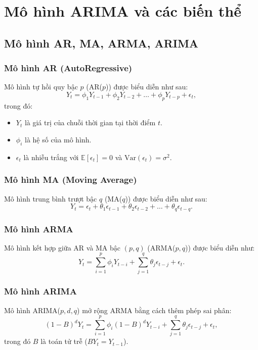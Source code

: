 \chapter{Mô hình ARIMA và các biến thể}

\section{Mô hình AR, MA, ARMA, ARIMA}

\subsection{Mô hình AR (AutoRegressive)}
Mô hình tự hồi quy bậc $p$ (AR($p$)) được biểu diễn như sau:
\begin{equation}
    Y_t = \phi_1 Y_{t-1} + \phi_2 Y_{t-2} + \dots + \phi_p Y_{t-p} + \epsilon_t,
\end{equation}
trong đó:
\begin{itemize}
    \item $Y_t$ là giá trị của chuỗi thời gian tại thời điểm $t$.
    \item $\phi_i$ là hệ số của mô hình.
    \item $\epsilon_t$ là nhiễu trắng với $\mathbb{E}[\epsilon_t] = 0$ và $\text{Var}(\epsilon_t) = \sigma^2$.
\end{itemize}

\subsection{Mô hình MA (Moving Average)}
Mô hình trung bình trượt bậc $q$ (MA($q$)) được biểu diễn như sau:
\begin{equation}
    Y_t = \epsilon_t + \theta_1 \epsilon_{t-1} + \theta_2 \epsilon_{t-2} + \dots + \theta_q \epsilon_{t-q}.
\end{equation}

\subsection{Mô hình ARMA}
Mô hình kết hợp giữa AR và MA bậc $(p,q)$ (ARMA($p,q$)) được biểu diễn như:
\begin{equation}
    Y_t = \sum_{i=1}^{p} \phi_i Y_{t-i} + \sum_{j=1}^{q} \theta_j \epsilon_{t-j} + \epsilon_t.
\end{equation}

\subsection{Mô hình ARIMA}
Mô hình ARIMA($p,d,q$) mở rộng ARMA bằng cách thêm phép sai phân:
\begin{equation}
    (1 - B)^d Y_t = \sum_{i=1}^{p} \phi_i (1 - B)^d Y_{t-i} + \sum_{j=1}^{q} \theta_j \epsilon_{t-j} + \epsilon_t,
\end{equation}
trong đó $B$ là toán tử trễ ($B Y_t = Y_{t-1}$).

